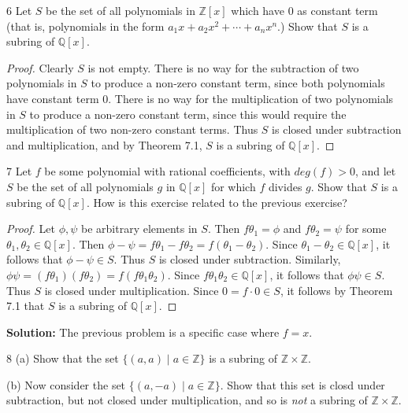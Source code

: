 \begin{problem}{6}
    Let $S$ be the set of all polynomials in $\mathbb{Z}[x]$ which have $0$ 
    as constant term (that is, polynomials in the form 
    $a_1 x + a_2 x^2 + \cdots + a_n x^n$.) Show that $S$ is a subring of 
    $\mathbb{Q}[x]$.
\end{problem}
\solved

\begin{proof}
    Clearly $S$ is not empty.
    There is no way for the subtraction of two polynomials in $S$ to 
        produce a non-zero constant term, since both polynomials have
        constant term $0$.
    There is no way for the multiplication of two polynomials in $S$
        to produce a non-zero constant term, since this would require
        the multiplication of two non-zero constant terms.
    Thus $S$ is closed under subtraction and multiplication,
        and by Theorem 7.1, $S$ is a subring of $\mathbb{Q}[x]$.
\end{proof}

\begin{problem}{7}
    Let $f$ be some polynomial with rational coefficients, with 
        $deg(f) > 0$, and let $S$ be the set of all polynomials $g$
        in $\mathbb{Q}[x]$ for which $f$ divides $g$. Show that $S$
        is a subring of $\mathbb{Q}[x]$. How is this exercise related to the 
        previous exercise?
\end{problem}
\solved

\begin{proof}
    Let $\phi, \psi$ be arbitrary elements in $S$.
    Then $f \theta_1 = \phi$ and $f \theta_2 = \psi$ for some
        $\theta_1, \theta_2 \in \mathbb{Q}[x]$.
    Then
        $\phi - \psi = f \theta_1 - f \theta_2 = f(\theta_1 - \theta_2)$.
    Since $\theta_1 - \theta_2 \in \mathbb{Q}[x]$, it follows that
        $\phi - \psi \in S$.
    Thus $S$ is closed under subtraction.
    Similarly,
        $\phi \psi = (f \theta_1)(f \theta_2) = f(f \theta_1 \theta_2)$.
    Since $f \theta_1 \theta_2 \in \mathbb{Q}[x]$, it follows that
        $\phi \psi \in S$.
    Thus $S$ is closed under multiplication.
    Since $0 = f \cdot 0 \in S$, it follows by Theorem 7.1 that
        $S$ is a subring of $\mathbb{Q}[x]$.
\end{proof}

\textbf{Solution:} The previous problem is a specific case where $f = x$.

\begin{problem}{8}
    (a) Show that the set $\{(a, a) \mid a \in \mathbb{Z}\}$
    is a subring of $\mathbb{Z} \times \mathbb{Z}$.

    (b) Now consider the set $\{(a, -a) \mid a \in \mathbb{Z}\}$.
    Show that this set is closd under subtraction, but not closed under 
    multiplication, and so is \emph{not} a subring of $\mathbb{Z} \times \mathbb{Z}$.
\end{problem}
\solved

